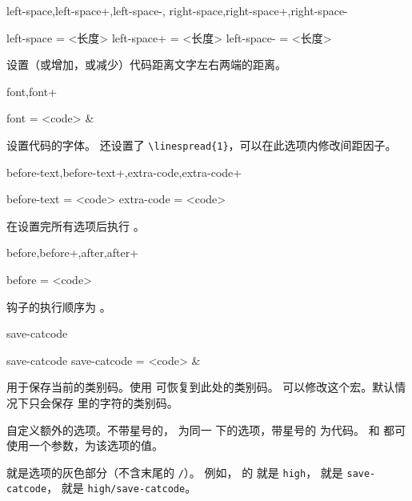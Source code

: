 \documentclass[class=article,openany]{cusdoc}
\begin{document}
\begin{keyval}[path=high]{left-space,left-space+,left-space-,
  right-space,right-space+,right-space-}
  \begin{syntax}
    left-space  = <长度>
    left-space+ = <长度>
    left-space- = <长度>
  \end{syntax}
设置（或增加，或减少）代码距离文字左右两端的距离。
\end{keyval}

\begin{keyval}[path=high]{font,font+}
  \begin{syntax}
    font = <code> & \V{\ttfamily\raggedright}
  \end{syntax}
设置代码的字体。 还设置了 \verb|\linespread{1}|，可以在此选项内修改间距因子。
\end{keyval}

\begin{keyval}[path=high]{before-text,before-text+,extra-code,extra-code+}
  \begin{syntax}
    before-text = <code>
    extra-code  = <code>
  \end{syntax}
在设置完所有选项后执行 。
\end{keyval}

\begin{keyval}[path=high]{before,before+,after,after+}
  \begin{syntax}
    before = <code>
  \end{syntax}
\end{keyval}

钩子的执行顺序为       。

\begin{keyval}[path=high]{save-catcode}
  \begin{syntax}
    save-catcode
    save-catcode = <code> &~
  \end{syntax}
用于保存当前的类别码。使用  可恢复到此处的类别码。 可以修改这个宏。默认情况下只会保存  里的字符的类别码。
\end{keyval}

\begin{function}{\texhighdefstyle}
  \begin{syntax}
    \V\texhighdefstyle   {} 
    \V\texhighdefstyle   {}  
    \V\texhighdefstyle *  
    \V\texhighdefstyle *   
  \end{syntax}
自定义额外的选项。不带星号的， 为同一  下的选项，带星号的  为代码。 和  都可使用一个参数，为该选项的值。

 就是选项的灰色部分（不含末尾的 \texttt{/}）。
例如， 的  就是 \texttt{high}，
 就是 \texttt{save-catcode}， 就是 \texttt{high/save-catcode}。
\end{function}
\end{document}
